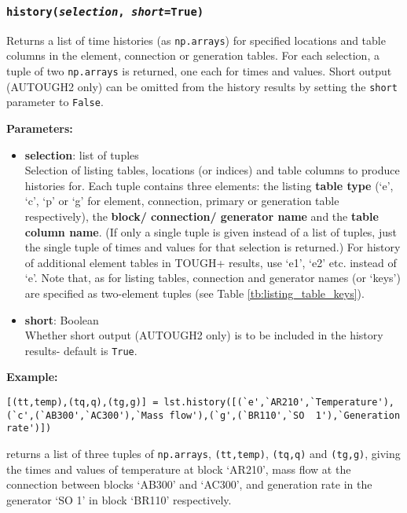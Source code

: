 \subsubsection{\texttt{history(\emph{selection}, \emph{short}=True)}}

Returns a list of time histories (as \texttt{np.arrays}) for specified locations and table columns in the element, connection or generation tables.  For each selection, a tuple of two \texttt{np.arrays} is returned, one each for times and values.  Short output (AUTOUGH2 only) can be omitted from the history results by setting the \texttt{short} parameter to \texttt{False}.

\textbf{Parameters:}
\begin{itemize}
\item \textbf{selection}: list of tuples\\
  Selection of listing tables, locations (or indices) and table columns to produce histories for.  Each tuple contains three elements: the listing \textbf{table type} (`e', `c', `p' or `g' for element, connection, primary or generation table respectively), the \textbf{block/ connection/ generator name} and the \textbf{table column name}.  (If only a single tuple is given instead of a list of tuples, just the single tuple of times and values for that selection is returned.)  For history of additional element tables in TOUGH+ results, use `e1', `e2' etc. instead of `e'.  Note that, as for listing tables, connection and generator names (or `keys') are specified as two-element tuples (see Table \ref{tb:listing_table_keys}).

\item \textbf{short}: Boolean\\
  Whether short output (AUTOUGH2 only) is to be included in the history results- default is \texttt{True}.
\end{itemize}

\textbf{Example:}

\begin{verbatim}
[(tt,temp),(tq,q),(tg,g)] = lst.history([(`e',`AR210',`Temperature'),
(`c',(`AB300',`AC300'),`Mass flow'),(`g',(`BR110',`SO  1'),`Generation rate')])
\end{verbatim}

returns a list of three tuples of \texttt{np.arrays}, \texttt{(tt,temp)}, \texttt{(tq,q)} and \texttt{(tg,g)}, giving the times and values of temperature at block `AR210', mass flow at the connection between blocks `AB300' and `AC300', and generation rate in the generator `SO  1' in block `BR110' respectively.

